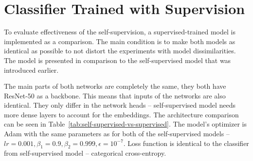 \section{\label{sec:supervised-classifier}Classifier Trained with Supervision}

To evaluate effectiveness of the self-supervision, a supervised-trained model is implemented as a comparison. The main condition is to make both models as identical as possible to not distort the experiments with model dissimilarities. The model is presented in comparison to the self-supervised model that was introduced earlier.

The main parts of both networks are completely the same, they both have ResNet-50 as a backbone. This means that inputs of the networks are also identical. They only differ in the network heads -- self-supervised model needs more dense layers to account for the embeddings. The architecture comparison can be seen in Table~\ref{tab:self-supervised-vs-supervised}. The model's optimizer is Adam with the same parameters as for both of the self-supervised models -- $lr = 0.001, \beta_1 = 0.9, \beta_2 = 0.999, \epsilon = 10^{-7}$. Loss function is identical to the classifier from self-supervised model -- categorical cross-entropy.

